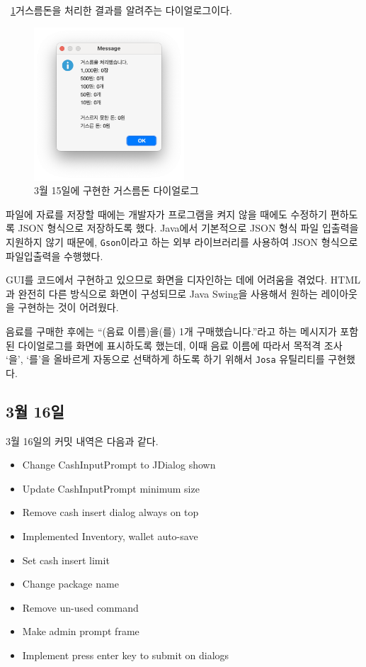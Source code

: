 \documentclass{oblivoir}
\newcommand{\figref}[1]{\figurename~\ref{#1}}
\begin{document}
    \figref{fig:0315-change-dialog}\은 거스름돈을 처리한 결과를 알려주는 다이얼로그이다.
    \begin{figure}[h]
        \centering
        \includegraphics[width=0.5\textwidth]{images/dev-snapshop/0315-change-dialog}
        \caption{3월 15일에 구현한 거스름돈 다이얼로그}
        \label{fig:0315-change-dialog}
    \end{figure}

    파일에 자료를 저장할 때에는 개발자가 프로그램을 켜지 않을 때에도 수정하기 편하도록 JSON 형식으로 저장하도록 했다.
    Java에서 기본적으로 JSON 형식 파일 입출력을 지원하지 않기 때문에, \texttt{Gson}이라고 하는 외부 라이브러리를 사용하여
    JSON 형식으로 파일입출력을 수행했다.

    GUI를 코드에서 구현하고 있으므로 화면을 디자인하는 데에 어려움을 겪었다.
    HTML과 완전히 다른 방식으로 화면이 구성되므로 Java Swing을 사용해서 원하는 레이아웃을 구현하는 것이 어려웠다.

    음료를 구매한 후에는 ``(음료 이름)을(를) 1개 구매했습니다.''라고 하는 메시지가 포함된
    다이얼로그를 화면에 표시하도록 했는데, 이때 음료 이름에 따라서 목적격 조사 `을', `를'을 올바르게 자동으로 선택하게 하도록 하기 위해서
    \texttt{Josa} 유틸리티를 구현했다.

    \subsection{3월 16일}

    3월 16일의 커밋 내역은 다음과 같다.
    \begin{itemize}
        \item Change CashInputPrompt to JDialog shown
        \item Update CashInputPrompt minimum size
        \item Remove cash insert dialog always on top
        \item Implemented Inventory, wallet auto-save
        \item Set cash insert limit
        \item Change package name
        \item Remove un-used command
        \item Make admin prompt frame
        \item Implement press enter key to submit on dialogs
    \end{itemize}
\end{document}
